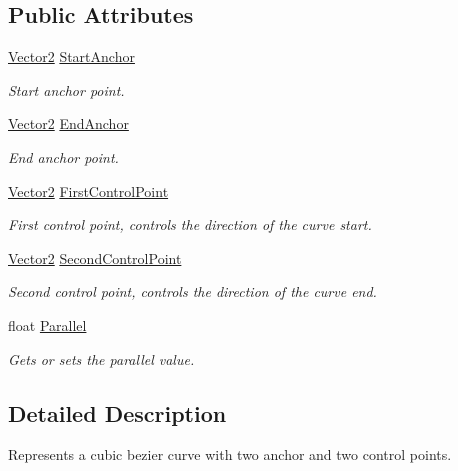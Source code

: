 \subsection*{Public Attributes}
\begin{DoxyCompactItemize}
\item 
\hyperlink{struct_open_t_k_1_1_vector2}{Vector2} \hyperlink{struct_open_t_k_1_1_bezier_curve_cubic_aa122836d3a523f8ad11ea8280f27d428}{Start\-Anchor}
\begin{DoxyCompactList}\small\item\em Start anchor point. \end{DoxyCompactList}\item 
\hyperlink{struct_open_t_k_1_1_vector2}{Vector2} \hyperlink{struct_open_t_k_1_1_bezier_curve_cubic_a8f31d2c4462dd02e5482de3ad157614d}{End\-Anchor}
\begin{DoxyCompactList}\small\item\em End anchor point. \end{DoxyCompactList}\item 
\hyperlink{struct_open_t_k_1_1_vector2}{Vector2} \hyperlink{struct_open_t_k_1_1_bezier_curve_cubic_ad55e000d61da79664cb352672d5ed4b0}{First\-Control\-Point}
\begin{DoxyCompactList}\small\item\em First control point, controls the direction of the curve start. \end{DoxyCompactList}\item 
\hyperlink{struct_open_t_k_1_1_vector2}{Vector2} \hyperlink{struct_open_t_k_1_1_bezier_curve_cubic_a1c0ba9edf4e147f97a4a15aff048ed73}{Second\-Control\-Point}
\begin{DoxyCompactList}\small\item\em Second control point, controls the direction of the curve end. \end{DoxyCompactList}\item 
float \hyperlink{struct_open_t_k_1_1_bezier_curve_cubic_ab908cd04927982b845885e24587f19c8}{Parallel}
\begin{DoxyCompactList}\small\item\em Gets or sets the parallel value. \end{DoxyCompactList}\end{DoxyCompactItemize}


\subsection{Detailed Description}
Represents a cubic bezier curve with two anchor and two control points. 



